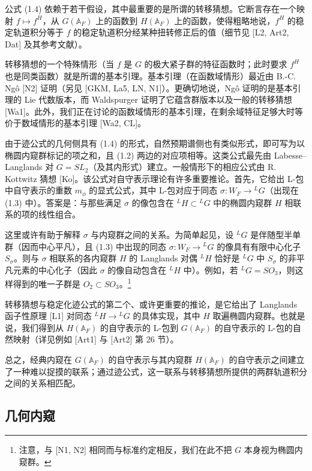 \documentclass[11pt,a4paper]{article}
\begin{document}
公式 (1.4) 依赖于若干假设，其中最重要的是所谓的转移猜想。它断言存在一个映射 $f\mapsto f^H$，从 $G(\mathbb{A}_F)$ 上的函数到 $H(\mathbb{A}_F)$ 上的函数，使得粗略地说，$f^H$ 的稳定轨道积分等于 $f$ 的稳定轨道积分经某种扭转修正后的值（细节见 [L2, Art2, Dat] 及其参考文献）。

转移猜想的一个特殊情形（当 $f$ 是 $G$ 的极大紧子群的特征函数时；此时要求 $f^H$ 也是同类函数）就是所谓的基本引理。基本引理（在函数域情形）最近由 B.-C. Ngô [N2] 证明（另见 [GKM, La5, LN, N1]）。更确切地说，Ngô 证明的是基本引理的 Lie 代数版本，而 Waldspurger 证明了它蕴含群版本以及一般的转移猜想 [Wa1]。此外，我们正在讨论的函数域情形的基本引理，在剩余域特征足够大时等价于数域情形的基本引理 [Wa2, CL]。

由于迹公式的几何侧具有 (1.4) 的形式，自然预期谱侧也有类似形式，即可写为以椭圆内窥群标记的项之和，且 (1.2) 两边的对应项相等。这类公式最先由 Labesse--Langlands 对 $G=SL_2$（及其内形式）建立。一般情形下的相应公式由 R. Kottwitz 猜想 [Ko]。该公式对自守表示理论有许多重要推论。首先，它给出 L-包中自守表示的重数 $m_\phi$ 的显式公式，其中 L-包对应于同态 $\sigma:W_F\to{}^{L}G$（出现在 (1.3) 中）。答案是：与那些满足 $\sigma$ 的像包含在 ${}^{L}H\subset{}^{L}G$ 中的椭圆内窥群 $H$ 相联系的项的线性组合。

这里或许有助于解释 $\sigma$ 与内窥群之间的关系。为简单起见，设 ${}^{L}G$ 是伴随型半单群（因而中心平凡），且 (1.3) 中出现的同态 $\sigma:W_F\to{}^{L}G$ 的像具有有限中心化子 $S_\sigma$。则与 $\sigma$ 相联系的各内窥群 $H$ 的 Langlands 对偶 ${}^{L}H$ 恰好是 ${}^{L}G$ 中 $S_\sigma$ 的非平凡元素的中心化子（因此 $\sigma$ 的像自动包含在 ${}^{L}H$ 中）。例如，若 ${}^{L}G=SO_3$，则这样得到的唯一子群是 $O_2\subset SO_3$。\footnote{注意，与 [N1, N2] 相同而与标准约定相反，我们在此不把 $G$ 本身视为椭圆内窥群。}

转移猜想与稳定化迹公式的第二个、或许更重要的推论，是它给出了 Langlands 函子性原理 [L1] 对同态 ${}^{L}H\to{}^{L}G$ 的具体实现，其中 $H$ 取遍椭圆内窥群。也就是说，我们得到从 $H(\mathbb{A}_F)$ 的自守表示的 L-包到 $G(\mathbb{A}_F)$ 的自守表示的 L-包的自然映射（详见例如 [Art1] 与 [Art2] 第 26 节）。

总之，经典内窥在 $G(\mathbb{A}_F)$ 的自守表示与其内窥群 $H(\mathbb{A}_F)$ 的自守表示之间建立了一种难以捉摸的联系；通过迹公式，这一联系与转移猜想所提供的两群轨道积分之间的关系相匹配。

\subsection{几何内窥}
\end{document}
